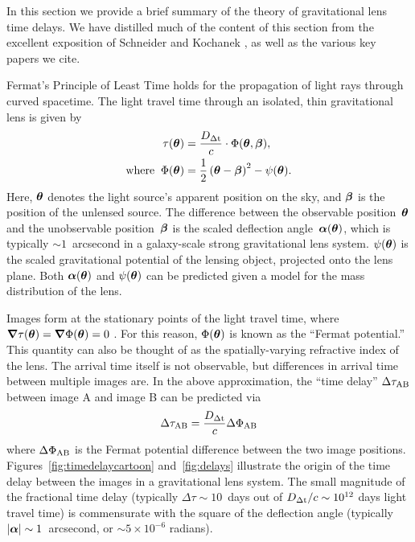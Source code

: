 
In this section we provide a brief summary of the theory of
gravitational lens time delays. We have distilled much of the content
of this section from the excellent exposition of Schneider and
Kochanek \citep{SKW06}, as well as the various key papers we cite.


Fermat's Principle of Least Time holds for the propagation of light rays
through curved spacetime. The light travel time through an isolated, thin
gravitational lens is given by
%
\begin{align}
    \tau(\boldsymbol{\theta}) &= \frac{D_{\Delta{\rm t}}}{c} \cdot \Phi(\boldsymbol{\theta},\boldsymbol{\beta}), \\
    \text{where\;\;} \Phi(\boldsymbol{\theta}) &= \frac{1}{2}\left(\boldsymbol{\theta} - \boldsymbol{\beta}\right)^2 - \psi(\boldsymbol{\theta}).
\end{align}
%
Here, $\boldsymbol{\theta}$ denotes the light source's apparent position on the sky, and
$\boldsymbol{\beta}$ is the position of the unlensed source. The difference between the
observable position~$\boldsymbol{\theta}$ and the unobservable position~$\boldsymbol{\beta}$ is the
scaled deflection angle~$\boldsymbol{\alpha}({\boldsymbol{\theta}})$, which is typically
$\sim1$~arcsecond in a galaxy-scale strong gravitational lens system.
$\psi(\boldsymbol{\theta})$ is the scaled gravitational potential of the lensing object,
projected onto the lens plane. Both $\boldsymbol{\alpha}(\boldsymbol{\theta})$ and $\psi(\boldsymbol{\theta})$ can be
predicted given a model for the mass distribution of the lens.

Images form at the stationary points of the light travel time, where $\boldsymbol{\nabla}
\tau(\boldsymbol{\theta}) = \boldsymbol{\nabla} \Phi(\boldsymbol{\theta}) = 0$ \citep{Schneider1985}. For this reason,
$\Phi(\boldsymbol{\theta})$ is known as the ``Fermat potential.'' This quantity can also
be thought of as the spatially-varying refractive index of the lens. The
arrival time itself is not observable, but differences in arrival time
between multiple images are. In the above approximation, the  ``time delay'' $\Delta \tau_{\rm AB}$
between image A and
image B can be predicted via
%
\begin{equation}
    \Delta \tau_{\rm AB} = \frac{D_{\Delta{\rm t}}}{c} \Delta \Phi_{\rm AB} \label{eq:timedelay}
\end{equation}
%
where $\Delta \Phi_{\rm AB}$ is the Fermat potential difference between the
two image positions.
Figures~\ref{fig:timedelaycartoon} and~\ref{fig:delays} illustrate the origin of the
time delay between the images in a gravitational lens system. The small
magnitude of the fractional time delay (typically $\Delta\tau \sim 10$~days out of
$D_{\Delta{\rm t}}/c \sim 10^{12}$ days light travel time)
is commensurate with the square of the
deflection angle (typically $|\boldsymbol{\alpha}|\sim1$~arcsecond, or $\sim 5\times10^{-6}$
radians).

